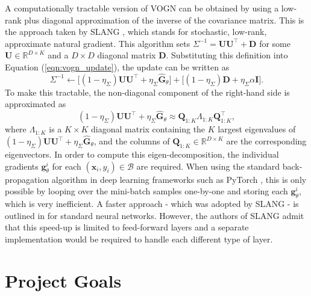 \documentclass[msc,deptreport.inf]{infthesis} %
\newcommand{\matr}[1]{\mathbf{#1}}
\newcommand{\R}{\mathbb R}
\begin{document}
A computationally tractable version of VOGN can be obtained by using a low-rank plus diagonal approximation of the inverse of the covariance matrix. This is the approach taken by SLANG \cite{mishkin2018}, which stands for stochastic, low-rank, approximate natural gradient. This algorithm sets $\Sigma^{-1} = \matr{U} \matr{U}^\intercal + \matr{D}$ for some $\matr{U} \in \R^{D \times K}$ and a $D \times D$ diagonal matrix $\matr{D}$. Substituting this definition into Equation (\ref{eqn:vogn_update}), the update can be written as
\begin{equation}
	\Sigma^{-1} \leftarrow 
	\big[(1 - \eta_\Sigma) \matr{U} \matr{U}^\intercal + \eta_\Sigma \hat{\matr{G}}_\theta \big] 
	+ \big[(1 - \eta_\Sigma) \matr{D} + \eta_\Sigma \alpha \matr{I}\big].
\end{equation}
To make this tractable, the non-diagonal component of the right-hand side is approximated as
\begin{equation}
	(1 - \eta_\Sigma) \matr{U} \matr{U}^\intercal + \eta_\Sigma \hat{\matr{G}}_\theta 
	\approx \matr{Q}_{1:K} \Lambda_{1:K} \matr{Q}_{1:K}^\intercal,
\end{equation}
where $\Lambda_{1:K}$ is a $K \times K$ diagonal matrix containing the $K$ largest eigenvalues of $(1 - \eta_\Sigma) \matr{U} \matr{U}^\intercal + \eta_\Sigma \hat{\matr{G}}_\theta$, and the columns of $\matr{Q}_{1:K} \in \R^{D \times K}$ are the corresponding eigenvectors. In order to compute this eigen-decomposition, the individual gradients $\matr{g}_\theta^i$ for each  $(\matr{x}_i, y_i) \in \mathcal{B}$ are required. When using the standard back-propagation algorithm in deep learning frameworks such as PyTorch \cite{paszke2019}, this is only possible by looping over the mini-batch samples one-by-one and storing each $\matr{g}_\theta^i$, which is very inefficient. A faster approach - which was adopted by SLANG - is outlined in \cite{goodfellow2015} for standard neural networks. However, the authors of SLANG admit that this speed-up is limited to feed-forward layers and a separate implementation would be required to handle each different type of layer. 


\section{Project Goals}
\end{document}
